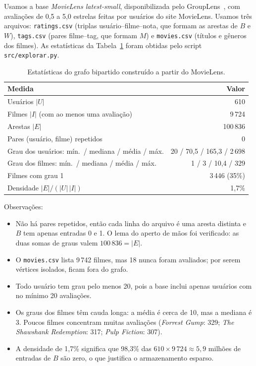 \documentclass[12pt,a4paper]{article}
\theoremstyle{definition}
\begin{document}
Usamos a base \emph{MovieLens latest-small}, disponibilizada pelo GroupLens~\cite{harper2015}, com avaliações de 0{,}5 a 5{,}0 estrelas feitas
por usuários do site MovieLens. Usamos três arquivos: \texttt{ratings.csv}
(triplas usuário--filme--nota, que formam as arestas de $B$ e $W$),
\texttt{tags.csv} (pares filme--tag, que formam $M$) e \texttt{movies.csv}
(títulos e gêneros dos filmes). As estatísticas da Tabela~\ref{tab:base}
foram obtidas pelo script \texttt{src/explorar.py}.

\begin{table}[ht]
\centering
\begin{tabular}{lr}
\toprule
Medida & Valor \\
\midrule
Usuários $|U|$ & 610 \\
Filmes $|I|$ (com ao menos uma avaliação) & 9\,724 \\
Arestas $|E|$ & 100\,836 \\
Pares (usuário, filme) repetidos & 0 \\
Grau dos usuários: mín.\ / mediana / média / máx. & 20 / 70{,}5 / 165{,}3 / 2\,698 \\
Grau dos filmes: mín.\ / mediana / média / máx. & 1 / 3 / 10{,}4 / 329 \\
Filmes com grau 1 & 3\,446 (35\%) \\
Densidade $|E| / (|U|\,|I|)$ & 1{,}7\% \\
\bottomrule
\end{tabular}
\caption{Estatísticas do grafo bipartido construído a partir do MovieLens.}
\label{tab:base}
\end{table}

Observações:
\begin{itemize}
  \item Não há pares repetidos, então cada linha do arquivo é uma aresta
        distinta e $B$ tem apenas entradas 0 e 1. O lema do aperto de mãos
        foi verificado: as duas somas de graus valem $100\,836 = |E|$.
  \item O \texttt{movies.csv} lista 9\,742 filmes, mas 18 nunca foram
        avaliados; por serem vértices isolados, ficam fora do grafo.
  \item Todo usuário tem grau pelo menos 20, pois a base inclui apenas
        usuários com no mínimo 20 avaliações.
  \item Os graus dos filmes têm cauda longa: a média é cerca de 10, mas a
        mediana é 3. Poucos filmes concentram muitas avaliações
        (\emph{Forrest Gump}: 329; \emph{The Shawshank Redemption}: 317;
        \emph{Pulp Fiction}: 307).
  \item A densidade de 1{,}7\% significa que 98{,}3\% das
        $610 \times 9\,724 \approx 5{,}9$ milhões de entradas de $B$ são
        zero, o que justifica o armazenamento esparso.
\end{itemize}
\end{document}
